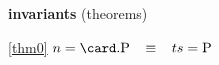 \textbf{invariants} (theorems)
\begin{block}
\item[ \eqref{thm0} ]{$n = \card.\Pcs \3\equiv ts = \Pcs$} %
\end{block}
